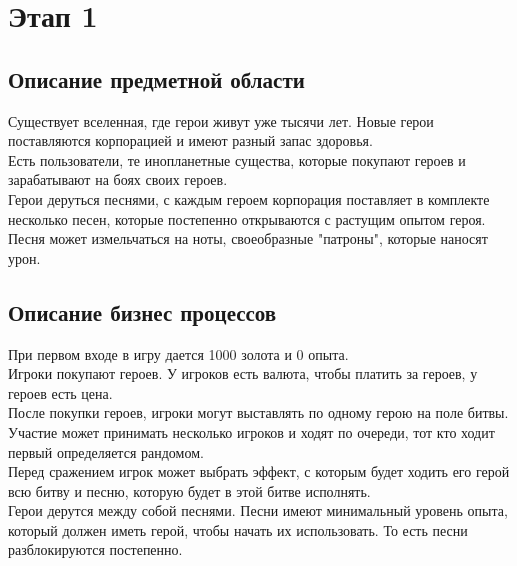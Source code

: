 \section*{Этап 1}


\subsection*{Описание предметной области}

Существует вселенная, где герои живут уже тысячи лет. Новые герои поставляются корпорацией и имеют разный запас здоровья.\\

Есть пользователи, те инопланетные существа, которые покупают героев и зарабатывают на боях своих героев.\\

Герои деруться песнями, с каждым героем корпорация поставляет в комплекте несколько песен, которые постепенно открываются с растущим опытом героя. Песня может измельчаться на ноты, своеобразные "патроны", которые наносят урон.


\subsection*{Описание бизнес процессов}


При первом входе в игру дается 1000 золота и 0 опыта.\\
    
Игроки покупают героев. У игроков есть валюта, чтобы платить за героев, у героев есть цена.\\

После покупки героев, игроки могут выставлять по одному герою на поле битвы. Участие может принимать несколько игроков и ходят по очереди, тот кто ходит первый определяется рандомом.\\

Перед сражением игрок может выбрать эффект, с которым будет ходить его герой всю битву и песню, которую будет в этой битве исполнять. \\

Герои дерутся между собой песнями. Песни имеют минимальный уровень опыта, который должен иметь герой, чтобы начать их использовать. То есть песни разблокируются постепенно.\\
    
